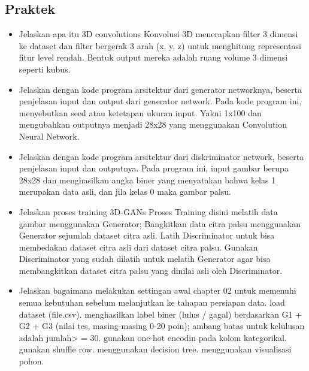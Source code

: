 \subsection{Praktek}
\begin{enumerate}
\begin{itemize}

	\item Jelaskan apa itu 3D convolutions
Konvolusi 3D menerapkan filter 3 dimensi ke dataset dan filter bergerak 3 arah (x, y, z) untuk menghitung representasi fitur level rendah. Bentuk output mereka adalah ruang volume 3 dimensi seperti kubus.

	\item Jelaskan dengan kode program arsitektur dari generator networknya, beserta penjelasan input dan output dari generator network.
Pada kode program ini, menyebutkan seed atau ketetapan ukuran input. Yakni 1x100 dan mengubahkan outputnya menjadi 28x28 yang menggunakan Convolution Neural Network.

		

	\item Jelaskan dengan kode program arsitektur dari diskriminator network, beserta penjelasan input dan outputnya.
Pada program ini, input gambar berupa 28x28 dan menghasilkan angka biner yang menyatakan bahwa kelas 1 merupakan data asli, dan jila kelas 0 maka gambar palsu.

		

	\item Jelaskan proses training 3D-GANs
Proses Training disini melatih data gambar menggunakan Generator;
Bangkitkan data citra palsu menggunakan Generator sejumlah dataset citra asli.
Latih Discriminator untuk bisa membedakan dataset citra asli dari dataset citra palsu.
Gunakan Discriminator yang sudah dilatih untuk melatih Generator agar bisa membangkitkan dataset citra palsu yang dinilai asli oleh Discriminator.

        	\item Jelaskan bagaimana melakukan settingan awal chapter 02 untuk memenuhi semua kebutuhan sebelum melanjutkan ke tahapan persiapan data.
load dataset (file.csv).
menghasilkan label biner (lulus / gagal) berdasarkan G1 + G2 + G3 (nilai tes, masing-masing 0-20 poin); ambang batas untuk kelulusan adalah jumlah> = 30.
gunakan one-hot encodin pada kolom kategorikal.
gunakan shuffle row.
menggunakan decision tree.
menggunakan visualisasi pohon.


\end{itemize}
\end{enumerate}
